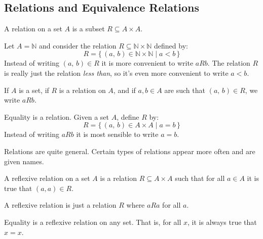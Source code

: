         \subsection{Relations and Equivalence Relations}
            \begin{definition}
                A relation on a set $A$ is a subset $R\subseteq{A}\times{A}$.
            \end{definition}
            \begin{example}
                Let $A=\mathbb{N}$ and consider the relation
                $R\subseteq\mathbb{N}\times\mathbb{N}$ defined by:
                \begin{equation}
                    R=\{\,(a,\,b)\in\mathbb{N}\times\mathbb{N}\;|\;
                        a<b\,\}
                \end{equation}
                Instead of writing $(a,\,b)\in{R}$ it is more convenient to
                write $aRb$. The relation $R$ is really just the relation
                \textit{less than}, so it's even more convenient to write
                $a<b$.
            \end{example}
            \begin{notation}
                If $A$ is a set, if $R$ is a relation on $A$, and if
                $a,b\in{A}$ are such that $(a,\,b)\in{R}$, we write
                $aRb$.
            \end{notation}
            \begin{example}
                Equality is a relation. Given a set $A$, define $R$ by:
                \begin{equation}
                    R=\{\,(a,\,b)\in{A}\times{A}\;|\;a=b\,\}
                \end{equation}
                Instead of writing $aRb$ it is most sensible to write $a=b$.
            \end{example}
            Relations are quite general. Certain types of relations appear more
            often and are given names.
            \begin{definition}
                A reflexive relation on a set $A$ is a relation
                $R\subseteq{A}\times{A}$ such that for all $a\in{A}$ it is true
                that $(a,a)\in{R}$.
            \end{definition}
            A reflexive relation is just a relation $R$ where $aRa$ for all $a$.
            \begin{example}
                Equality is a reflexive relation on any set. That is, for all
                $x$, it is always true that $x=x$.
            \end{example}
